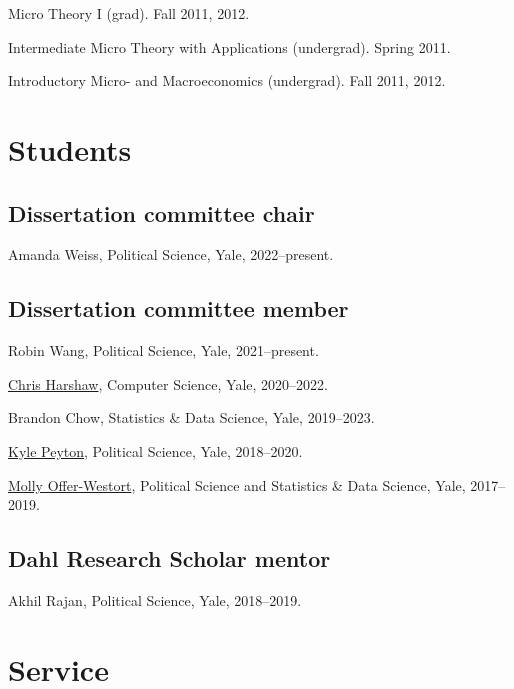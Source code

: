 \documentclass[10pt,letterpaper]{article}
\newenvironment{infolist}{
	\begin{list}{}{
		\setlength{\parskip}{0pt}
		\setlength{\itemsep}{4pt}
		\setlength{\parsep}{0.3em}
		\setlength{\leftmargin}{0em}
		\setlength{\labelwidth}{0em}
		}
	}{
\end{list}
}
\newcommand{\infoitem}[1]{\item {#1}}
\begin{document}
	\begin{infolist}
		\infoitem{Micro Theory I (grad). Fall 2011, 2012.}
		\infoitem{Intermediate Micro Theory with Applications (undergrad). Spring 2011.}
		\infoitem{Introductory Micro- and Macroeconomics (undergrad). Fall 2011, 2012.}
	\end{infolist}


	\section*{Students}

	\subsection*{Dissertation committee chair}

	\begin{infolist}
		\infoitem{Amanda Weiss, Political Science, Yale, 2022--present.}
	\end{infolist}

	\subsection*{Dissertation committee member}

	\begin{infolist}
		\infoitem{Robin Wang, Political Science, Yale, 2021--present.}
		\infoitem{\href{http://www.chrisharshaw.com/}{Chris Harshaw}, Computer Science, Yale, 2020--2022.}
		\infoitem{Brandon Chow, Statistics \& Data Science, Yale, 2019--2023.}
		\infoitem{\href{https://kylepeyton.github.io}{Kyle Peyton}, Political Science, Yale, 2018--2020.}
		\infoitem{\href{https://mollyow.github.io}{Molly Offer-Westort}, Political Science and Statistics \& Data Science, Yale, 2017--2019.}
	\end{infolist}

	\subsection*{Dahl Research Scholar mentor}

	\begin{infolist}
		\infoitem{Akhil Rajan, Political Science, Yale, 2018--2019.}
	\end{infolist}


	\section*{Service}
\end{document}
